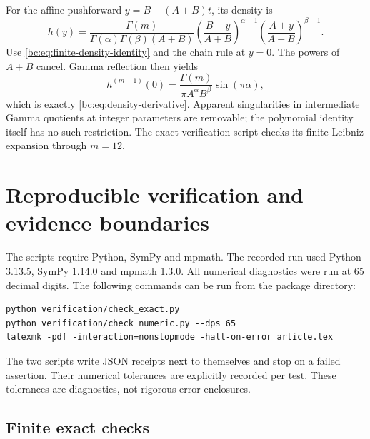 \documentclass[11pt,letterpaper]{article}
\numberwithin{equation}{section}
\theoremstyle{definition}
\theoremstyle{remark}
\begin{document}
For the affine pushforward $y=B-(A+B)t$, its density is
\[
 h(y)=\frac{\Gamma(m)}{\Gamma(\alpha)\Gamma(\beta)(A+B)}
 \left(\frac{B-y}{A+B}\right)^{\alpha-1}
 \left(\frac{A+y}{A+B}\right)^{\beta-1}.
\]
Use \eqref{bc:eq:finite-density-identity} and the chain rule at $y=0$.
The powers of $A+B$ cancel. Gamma reflection then yields
\[
 h^{(m-1)}(0)=\frac{\Gamma(m)}{\pi A^\alpha B^\beta}
                                      \sin(\pi\alpha),
\]
which is exactly \eqref{bc:eq:density-derivative}. Apparent singularities
in intermediate Gamma quotients at integer parameters are removable;
the polynomial identity itself has no such restriction. The exact
verification script checks its finite Leibniz expansion through $m=12$.

\section{Reproducible verification and evidence boundaries}
\label{bc:app:verification}

The scripts require Python, SymPy and mpmath. The recorded run used
Python 3.13.5, SymPy 1.14.0 and mpmath 1.3.0. All numerical diagnostics
were run at 65 decimal digits. The following commands can be run from
the package directory:
\begin{verbatim}
python verification/check_exact.py
python verification/check_numeric.py --dps 65
latexmk -pdf -interaction=nonstopmode -halt-on-error article.tex
\end{verbatim}
The two scripts write JSON receipts next to themselves and stop on a
failed assertion. Their numerical tolerances are explicitly recorded
per test. These tolerances are diagnostics, not rigorous error enclosures.

\subsection{Finite exact checks}
\end{document}
